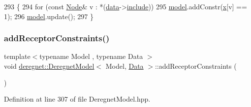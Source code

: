 \begin{DoxyCode}
293                                                        \{
294     \textcolor{keywordflow}{for} (\textcolor{keyword}{const} \hyperlink{namespacederegnet_a744bad34f2de9856d36715a445f027f3}{Node}& v : *(\hyperlink{classderegnet_1_1DeregnetModel_ad5399761cf6293a702f3800bda4806d1}{data}->\hyperlink{classderegnet_1_1DeregnetData_a438d16e60be5d119d174aa039f070ab2}{include}))
295         \hyperlink{classderegnet_1_1DeregnetModel_a30d525de2086e342b33fe3e45ede4947}{model}.addConstr(\hyperlink{classderegnet_1_1DeregnetModel_a360c980f3fec4dfbab50e9bb06a933a8}{x}[v] == 1);
296     \hyperlink{classderegnet_1_1DeregnetModel_a30d525de2086e342b33fe3e45ede4947}{model}.update();
297 \}
\end{DoxyCode}
\mbox{\label{classderegnet_1_1DeregnetModel_a6d8c05a79c11aefcf05bcdbf9f17aacb}} 
\subsubsection{\texorpdfstring{add\+Receptor\+Constraints()}{addReceptorConstraints()}\hspace{0.1cm}{\footnotesize\ttfamily [1/2]}}
{\footnotesize\ttfamily template$<$typename Model , typename Data $>$ \\
void \hyperlink{classderegnet_1_1DeregnetModel}{deregnet\+::\+Deregnet\+Model}$<$ Model, \hyperlink{avgdrgnt_8cpp_a1d1235306db276e9b36acba1db1509e8}{Data} $>$\+::add\+Receptor\+Constraints (\begin{DoxyParamCaption}{ }\end{DoxyParamCaption})}



Definition at line 307 of file Deregnet\+Model.\+hpp.


